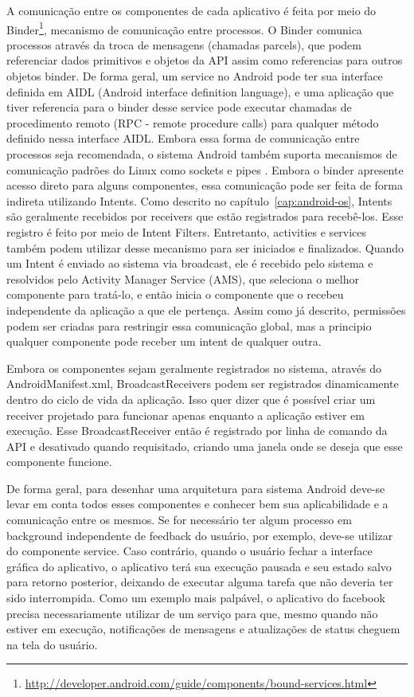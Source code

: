 A comunicação entre os componentes de cada aplicativo é feita por meio do Binder\footnote{\url{http://developer.android.com/guide/components/bound-services.html}}, mecanismo de comunicação entre processos. O Binder comunica processos através da troca de mensagens (chamadas parcels), que podem referenciar dados primitivos e objetos da API assim como referencias para outros objetos binder. De forma geral, um service no Android pode ter sua interface definida em AIDL (Android interface definition language), e uma aplicação que tiver referencia para o binder desse service pode executar chamadas de procedimento remoto (RPC - remote procedure calls) para qualquer método definido nessa interface AIDL. Embora essa forma de comunicação entre processos seja recomendada, o sistema Android também suporta mecanismos de comunicação padrões do Linux como sockets e pipes \cite{heuser2014}. Embora o binder apresente acesso direto para alguns componentes, essa comunicação pode ser feita de forma indireta utilizando Intents. Como descrito no capítulo~\ref{cap:android-os}, Intents são geralmente recebidos por receivers que estão registrados para recebê-los. Esse registro é feito por meio de Intent Filters. Entretanto, activities e services também podem utilizar desse mecanismo para ser iniciados e finalizados. Quando um Intent é enviado ao sistema via broadcast, ele é recebido pelo sistema e resolvidos pelo Activity Manager Service (AMS), que seleciona o melhor componente para tratá-lo, e então inicia o componente que o recebeu independente da aplicação a que ele pertença. Assim como já descrito, permissões podem ser criadas para restringir essa comunicação global, mas a principio qualquer componente pode receber um intent de qualquer outra. 

Embora os componentes sejam geralmente registrados no sistema, através do AndroidManifest.xml, BroadcastReceivers podem ser registrados dinamicamente dentro do ciclo de vida da aplicação. Isso quer dizer que é possível criar um receiver projetado para funcionar apenas enquanto a aplicação estiver em execução. Esse BroadcastReceiver então é registrado por linha de comando da API e desativado quando requisitado, criando uma janela onde se deseja que esse componente funcione.

De forma geral, para desenhar uma arquitetura para sistema Android deve-se levar em conta todos esses componentes e conhecer bem sua aplicabilidade e a comunicação entre os mesmos. Se for necessário ter algum processo em background independente de feedback do usuário, por exemplo, deve-se utilizar do componente service. Caso contrário, quando o usuário fechar a interface gráfica do aplicativo, o aplicativo terá sua execução pausada e seu estado salvo para retorno posterior, deixando de executar alguma tarefa que não deveria ter sido interrompida. Como um exemplo mais palpável, o aplicativo do facebook precisa necessariamente utilizar de um serviço para que, mesmo quando não estiver em execução, notificações de mensagens e atualizações de status cheguem na tela do usuário.

